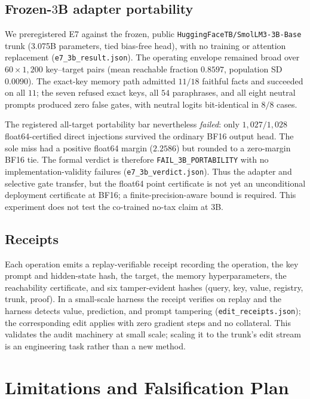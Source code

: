 \documentclass[10pt,twocolumn]{article}
\theoremstyle{remark}
\begin{document}
\subsection{Frozen-$3$B adapter portability}

We preregistered E7 against the frozen, public
\texttt{HuggingFaceTB/SmolLM3-3B-Base} trunk (3.075B parameters, tied bias-free
head), with no training or attention replacement
(\texttt{e7\_3b\_result.json}). The operating envelope remained broad over
$60\times1{,}200$ key--target pairs (mean reachable fraction $0.8597$, population
SD $0.0090$). The exact-key memory path admitted $11/18$ faithful facts and
succeeded on all $11$; the seven refused exact keys, all $54$ paraphrases, and
all eight neutral prompts produced zero false gates, with neutral logits
bit-identical in $8/8$ cases.

The registered all-target portability bar nevertheless \emph{failed}: only
$1{,}027/1{,}028$ float64-certified direct injections survived the ordinary
BF16 output head. The sole miss had a positive float64 margin ($2.2586$) but
rounded to a zero-margin BF16 tie. The formal verdict is therefore
\texttt{FAIL\_3B\_PORTABILITY} with no implementation-validity failures
(\texttt{e7\_3b\_verdict.json}). Thus the adapter and selective gate transfer,
but the float64 point certificate is not yet an unconditional deployment
certificate at BF16; a finite-precision-aware bound is required. This experiment
does not test the co-trained no-tax claim at $3$B.

\subsection{Receipts}
\label{sec:receipts}

Each operation emits a replay-verifiable receipt recording the operation, the key
prompt and hidden-state hash, the target, the memory hyperparameters, the
reachability certificate, and six tamper-evident hashes (query, key, value,
registry, trunk, proof). In a small-scale harness the receipt verifies on replay
and the harness detects value, prediction, and prompt tampering
(\texttt{edit\_receipts.json}); the corresponding
edit applies with zero gradient steps and no collateral. This validates the audit
machinery at small scale; scaling it to the trunk's edit stream is an engineering
task rather than a new method.

\section{Limitations and Falsification Plan}
\label{sec:limits}
\end{document}
